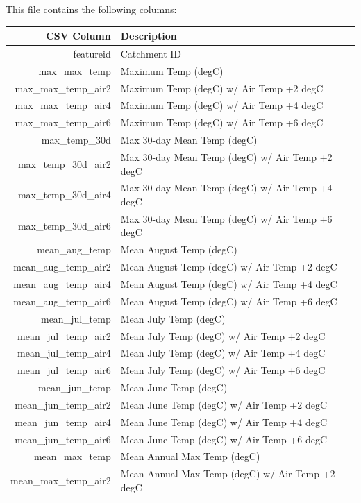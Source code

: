\documentclass[
]{book}
\begin{document}
This file contains the following columns:

\begin{tabular}{r|l}
\hline
CSV Column & Description\\
\hline
featureid & Catchment ID\\
\hline
max\_max\_temp & Maximum Temp (degC)\\
\hline
max\_max\_temp\_air2 & Maximum Temp (degC) w/ Air Temp +2 degC\\
\hline
max\_max\_temp\_air4 & Maximum Temp (degC) w/ Air Temp +4 degC\\
\hline
max\_max\_temp\_air6 & Maximum Temp (degC) w/ Air Temp +6 degC\\
\hline
max\_temp\_30d & Max 30-day Mean Temp (degC)\\
\hline
max\_temp\_30d\_air2 & Max 30-day Mean Temp (degC) w/ Air Temp +2 degC\\
\hline
max\_temp\_30d\_air4 & Max 30-day Mean Temp (degC) w/ Air Temp +4 degC\\
\hline
max\_temp\_30d\_air6 & Max 30-day Mean Temp (degC) w/ Air Temp +6 degC\\
\hline
mean\_aug\_temp & Mean August Temp (degC)\\
\hline
mean\_aug\_temp\_air2 & Mean August Temp (degC) w/ Air Temp +2 degC\\
\hline
mean\_aug\_temp\_air4 & Mean August Temp (degC) w/ Air Temp +4 degC\\
\hline
mean\_aug\_temp\_air6 & Mean August Temp (degC) w/ Air Temp +6 degC\\
\hline
mean\_jul\_temp & Mean July Temp (degC)\\
\hline
mean\_jul\_temp\_air2 & Mean July Temp (degC) w/ Air Temp +2 degC\\
\hline
mean\_jul\_temp\_air4 & Mean July Temp (degC) w/ Air Temp +4 degC\\
\hline
mean\_jul\_temp\_air6 & Mean July Temp (degC) w/ Air Temp +6 degC\\
\hline
mean\_jun\_temp & Mean June Temp (degC)\\
\hline
mean\_jun\_temp\_air2 & Mean June Temp (degC) w/ Air Temp +2 degC\\
\hline
mean\_jun\_temp\_air4 & Mean June Temp (degC) w/ Air Temp +4 degC\\
\hline
mean\_jun\_temp\_air6 & Mean June Temp (degC) w/ Air Temp +6 degC\\
\hline
mean\_max\_temp & Mean Annual Max Temp (degC)\\
\hline
mean\_max\_temp\_air2 & Mean Annual Max Temp (degC) w/ Air Temp +2 degC\\

\end{tabular}
\end{document}
